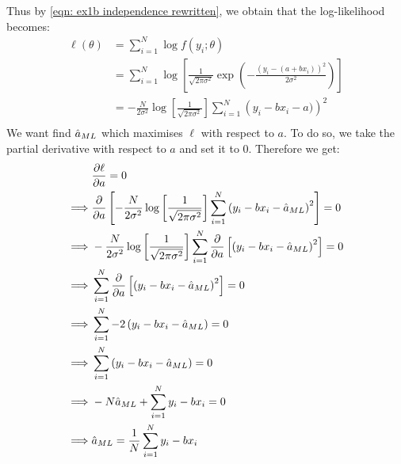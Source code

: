\documentclass[12pt]{article}
\begin{document}
Thus by \eqref{eqn: ex1b independence rewritten}, we obtain that the log-likelihood becomes:
\begin{align*}
    \ell(\theta)
     & = \sum_{i=1}^N \log f(y_i ; \theta)                                                                                                          \\
     & = \sum_{i=1}^N \log \left[\frac{1}{\sqrt{2 \pi \sigma^{2}}} \exp \left(-\frac{\left(y_i - (a + bx_i)\right)^{2}}{2 \sigma^{2}}\right)\right] \\
     & = -\frac{N}{2 \sigma^2}\log \left[\frac{1}{\sqrt{2 \pi \sigma^{2}}}\right] \sum_{i=1}^N \left(y_i - bx_i - a)\right)^{2}                     \\
\end{align*}
We want find \(\hat a_{ML}\) which maximises \(\ell\) with respect to \(a\). To do so, we take the partial derivative with respect to \(a\) and set it to 0. Therefore we get:
\begin{align*}
             &
    \frac{\partial \ell}{\partial a} = 0                                                                                                                                    \\
    \implies &
    \frac{\partial}{\partial a} \left[-\frac{N}{2 \sigma^2}\log \left[\frac{1}{\sqrt{2 \pi \sigma^{2}}}\right] \sum_{i=1}^N \left(y_i - bx_i - \hat a_{ML} \right)^{2}\right] = 0  \\
    \implies &
    -\frac{N}{2 \sigma^2}\log \left[\frac{1}{\sqrt{2 \pi \sigma^{2}}}\right] \sum_{i=1}^N \frac{\partial}{\partial a} \left[ \left(y_i - bx_i - \hat a_{ML} \right)^{2}\right] = 0 \\
    \implies &
    \sum_{i=1}^N \frac{\partial}{\partial a} \left[ \left(y_i - bx_i - \hat a_{ML} \right)^{2}\right] = 0                                                                          \\
    \implies &
    \sum_{i=1}^N -2 \left(y_i - bx_i - \hat a_{ML} \right) = 0                                                                                                                     \\
    \implies &
    \sum_{i=1}^N \left(y_i - bx_i - \hat a_{ML} \right) = 0                                                                                                                        \\
    \implies &
    - N \hat a_{ML} + \sum_{i=1}^N y_i - bx_i = 0                                                                                                                                  \\
    \implies &
    \hat a_{ML} = \frac{1}{N} \sum_{i=1}^N y_i - bx_i                                                                                                                              \\
\end{align*}
\end{document}
